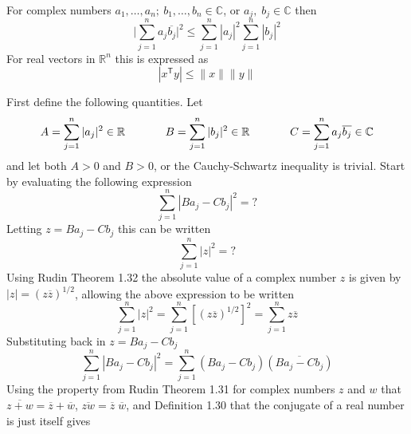\begin{thm-dan}
  For complex numbers $a_{1},\dots,a_{n};\:b_{1},\dots,b_{n}\in\mathbb{C}$, or $a_{j},\;b_{j}\in\mathbb{C}$ then
  \begin{equation*}
  \biggr|\sum_{j=1}^{n}a_{j}\overline{b_{j}}\biggr|^{2}\leq\sum_{j=1}^{n}|a_{j}|^{2}\sum_{j=1}^{n}|b_{j}|^{2}
  \end{equation*}
  For real vectors in $\mathbb{R}^{n}$ this is expressed as
  \begin{equation*}
  |x^{\mathsf{T}}y|\leq\|x\|\|y\|
  \end{equation*}
\end{thm-dan}

\begin{proof-dan}
  First define the following quantities.
  Let
  \begin{equation*}
    A=\sum_{j=1}^{n}|a_{j}|^{2}\in\mathbb{R}\hspace{0.5in}
    B=\sum_{j=1}^{n}|b_{j}|^{2}\in\mathbb{R}\hspace{0.5in}
    C=\sum_{j=1}^{n}a_{j}\overline{b_{j}}\in\mathbb{C}
  \end{equation*}
  and let both $A>0$ and $B>0$, or the Cauchy-Schwartz inequality is trivial.
  Start by evaluating the following expression
  \begin{equation*}
    \sum_{j=1}^{n}|Ba_{j}-Cb_{j}|^{2}=?
  \end{equation*}
  Letting $z=Ba_{j}-Cb_{j}$ this can be written
  \begin{equation*}
    \sum_{j=1}^{n}|z|^{2}=?
  \end{equation*}
  Using Rudin Theorem 1.32 the absolute value of a complex number $z$ is given by $|z|=(z\overline{z})^{1/2}$, allowing the above expression to be written
  \begin{equation*}
    \sum_{j=1}^{n}|z|^{2}=\sum_{j=1}^{n}[(z\overline{z})^{1/2}]^{2}=\sum_{j=1}^{n}z\overline{z}
  \end{equation*}
  Substituting back in $z=Ba_{j}-Cb_{j}$
  \begin{equation*}
    \sum_{j=1}^{n}|Ba_{j}-Cb_{j}|^{2}=\sum_{j=1}^{n}(Ba_{j}-Cb_{j})(\overline{Ba_{j}-Cb_{j}})
  \end{equation*}
  Using the property from Rudin Theorem 1.31 for complex numbers $z$ and $w$ that $\overline{z+w}=\overline{z}+\overline{w}$, $\overline{zw}=\overline{z}\;\overline{w}$, and Definition 1.30 that the conjugate of a real number is just itself gives
  \begin{equation*}

\end{equation*}
\end{proof-dan}
